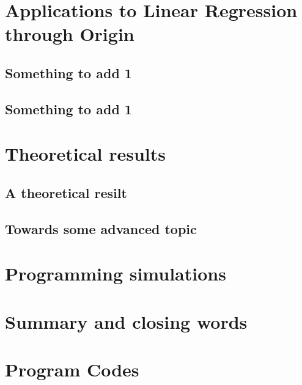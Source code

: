 \documentclass[12pt,a4paper,oneside]{book} %
\begin{document}
	\clearpage

	
	\chapter{Applications to Linear Regression through Origin}


	\clearpage

	\section{Something to add 1} 
	
	\section{Something to add 1} 

	\chapter{Theoretical results} %
	
	\section{A theoretical resilt}
	
	\section{Towards some advanced topic}

	\chapter{Programming simulations} %


		
	\chapter{Summary and closing words}
	



	
	
	
	
	\appendix
	
	\chapter{Program Codes}
	
\end{document}
